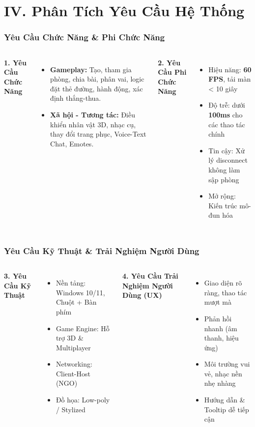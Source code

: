 \section{IV. Phân Tích Yêu Cầu Hệ Thống}

\begin{frame}
\frametitle{Yêu Cầu Chức Năng \& Phi Chức Năng}
\begin{columns}
    \textbf{1. Yêu Cầu Chức Năng}
    \begin{itemize}
        \item \textbf{Gameplay:} Tạo, tham gia phòng, chia bài, phân vai, logic đặt thẻ đường, hành động, xác định thắng-thua.
        \item \textbf{Xã hội - Tương tác:} Điều khiển nhân vật 3D, nhạc cụ, thay đổi trang phục, Voice-Text Chat, Emotes.
    \end{itemize}

    \textbf{2. Yêu Cầu Phi Chức Năng}
    \begin{itemize}
        \item Hiệu năng: \textbf{ 60 FPS}, tải màn < 10 giây
        \item Độ trễ: dưới \textbf{100ms} cho các thao tác chính
        \item Tin cậy: Xử lý disconnect không làm sập phòng
        \item Mở rộng: Kiến trúc mô-đun hóa
    \end{itemize}
\end{columns}

\end{frame}

\begin{frame}
\frametitle{Yêu Cầu Kỹ Thuật \& Trải Nghiệm Người Dùng}

\begin{columns}
    \textbf{3. Yêu Cầu Kỹ Thuật}
    \begin{itemize}
        \item Nền tảng: Windows 10/11, Chuột + Bàn phím
        \item Game Engine: Hỗ trợ 3D \& Multiplayer
        \item Networking: Client-Host (NGO)
        \item Đồ họa: Low-poly / Stylized
    \end{itemize}

    \textbf{4. Yêu Cầu Trải Nghiệm Người Dùng (UX)}
    \begin{itemize}
        \item Giao diện rõ ràng, thao tác mượt mà
        \item Phản hồi nhanh (âm thanh, hiệu ứng)
        \item Môi trường vui vẻ, nhạc nền nhẹ nhàng
        \item Hướng dẫn \& Tooltip dễ tiếp cận
    \end{itemize}
\end{columns}
\end{frame}
